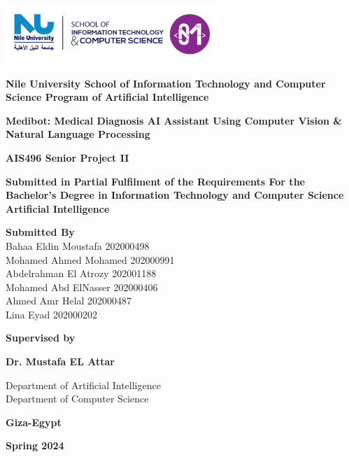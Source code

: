 \begin{titlepage}
    \begin{center}
 
        \includegraphics[width=0.6\textwidth]{Figures/nuLogo.png}
 
       \textbf{ Nile University
 School of Information Technology and Computer Science
 Program of Artificial Intelligence}
 
 
         \textbf{\large   Medibot: Medical Diagnosis AI Assistant Using Computer Vision \& Natural Language Processing}
         \vspace{1.2cm} \\
         
      
             
 \vspace{0.5cm}
 
         \textbf{AIS496 Senior Project II}
         
         \textbf{Submitted in Partial Fulfilment of the Requirements
         For the Bachelor’s Degree in Information Technology and Computer Science
         Artificial Intelligence}
             
        \vspace{0.6cm}
      \textbf{\textbf{Submitted By}} \\Bahaa Eldin Moustafa 202000498 \\ Mohamed Ahmed Mohamed 202000991\\ Abdelrahman El Atrozy 202001188\\ Mohamed Abd ElNasser 202000406\\ Ahmed Amr Helal 202000487\\ Lina Eyad 202000202
 
        \vspace{0.3cm}
       \textbf{Supervised by}
       
       \textbf{Dr. Mustafa EL Attar}
        \vspace{0.8cm}
             
     Department of  Artificial Intelligence \\ Department of Computer Science
            \vspace{0.5cm}
            
     \textbf{Giza-Egypt}
     
     \textbf{Spring 2024}
               
    \end{center}
 \end{titlepage}